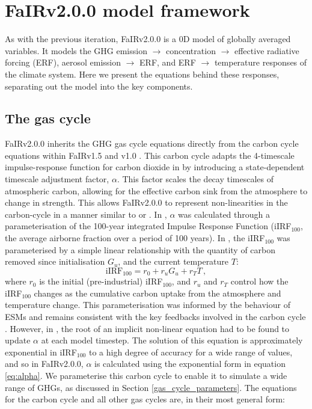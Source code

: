 \documentclass[gmd, manuscript]{copernicus}
\begin{document}
\section{FaIRv2.0.0 model framework} \label{framework}
As with the previous iteration, FaIRv2.0.0 is a 0D model of globally averaged variables. It models the GHG emission $\rightarrow$ concentration $\rightarrow$ effective radiative forcing (ERF), aerosol emission $\rightarrow$ ERF, and ERF $\rightarrow$ temperature responses of the climate system. Here we present the equations behind these responses, separating out the model into the key components. 
\subsection{The gas cycle} \label{gas_cycle}
FaIRv2.0.0 inherits the GHG gas cycle equations directly from the carbon cycle equations within FaIRv1.5 \citep{Smith2018} and v1.0 \citep{Millar2016}. This carbon cycle adapts the 4-timescale impulse-response function for carbon dioxide in \citet{Joos2013} by introducing a state-dependent timescale adjustment factor, $\alpha$. This factor scales the decay timescales of atmospheric carbon, allowing for the effective carbon sink from the atmosphere to change in strength. This allows FaIRv2.0.0 to represent non-linearities in the carbon-cycle in a manner similar to \citet{JOOS1996} or \citet{Hooss2001}. In \citet{Millar2016}, $\alpha$ was calculated through a parameterisation of the 100-year integrated Impulse Response Function (iIRF$_{100}$, the average airborne fraction over a period of 100 years). In \citet{Millar2016}, the iIRF$_{100}$ was parameterised by a simple linear relationship with the quantity of carbon removed since initialisation $G_u$, and the current temperature $T$:
\begin{equation}
    \mathrm{iIRF_{100}} = r_0 + r_u G_u + r_T T\,,
\end{equation}
where $r_0$ is the initial (pre-industrial) iIRF$_{100}$, and $r_u$ and $r_T$ control how the iIRF$_{100}$ changes as the cumulative carbon uptake from the atmosphere and temperature change. This parameterisation was informed by the behaviour of ESMs and remains consistent with the key feedbacks involved in the carbon cycle \citep{K.Arora2020}. However, in \citet{Millar2016}, the root of an implicit non-linear equation had to be found to update $\alpha$ at each model timestep. The solution of this equation is approximately exponential in iIRF$_{100}$ to a high degree of accuracy for a wide range of values, and so in FaIRv2.0.0, $\alpha$ is calculated using the exponential form in equation \ref{eq:alpha}. We parameterise this carbon cycle to enable it to simulate a wide range of GHGs, as discussed in Section \ref{gas_cycle_parameters}. The equations for the carbon cycle and all other gas cycles are, in their most general form:\\
\end{document}
